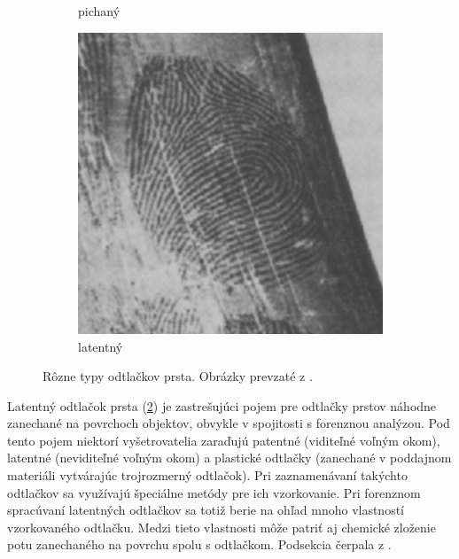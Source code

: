 \begin{figure}[h]
\begin{subfigure}[b]{0.32\linewidth}
      \caption{pichaný}
      \label{obr:pichany_odtlacok}
    \end{subfigure}
    \hfill
    \begin{subfigure}[b]{0.32\linewidth}
      \includegraphics[width=\linewidth]{obrazky-figures/latentny_odtlacok-Drahansky.png}
      \caption{latentný}
      \label{obr:latentny_odtlacok}
    \end{subfigure}
    \caption{Rôzne typy odtlačkov prsta. Obrázky prevzaté z \cite{Drahansky}.}
    \label{obr:druhy_odtlackov}
  \end{figure}
  
  Latentný odtlačok prsta (\ref{obr:latentny_odtlacok}) je zastrešujúci pojem pre odtlačky prstov náhodne zanechané na povrchoch objektov, obvykle v spojitosti
  s forenznou analýzou. Pod tento pojem niektorí vyšetrovatelia zaraďujú patentné (viditeľné voľným okom), latentné (neviditeľné voľným okom) a plastické odtlačky
  (zanechané v poddajnom materiáli vytvárajúc trojrozmerný odtlačok). Pri zaznamenávaní takýchto odtlačkov sa využívajú špeciálne metódy pre ich vzorkovanie.
  Pri forenznom spracúvaní latentných odtlačkov sa totiž berie na ohľad mnoho vlastností vzorkovaného odtlačku. Medzi tieto vlastnosti môže patriť aj
  chemické zloženie potu zanechaného na povrchu spolu s odtlačkom. Podsekcia čerpala z \cite{FingerprintSrcBook}.

